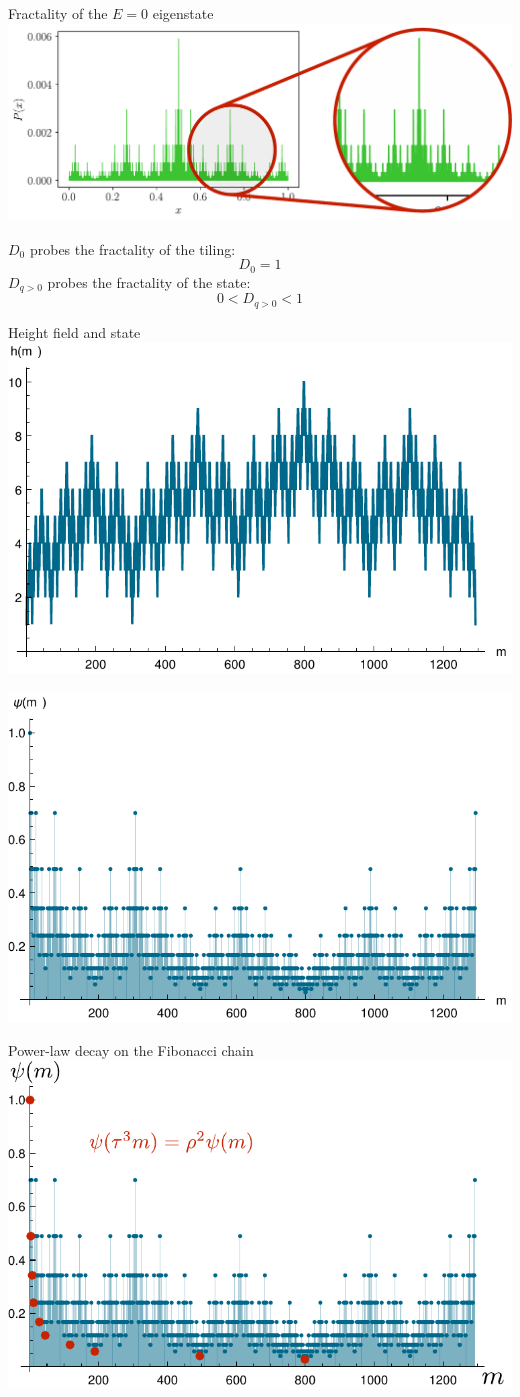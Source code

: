 \begin{frame}{Fractality of the $E=0$ eigenstate}
\centering
\includegraphics[width=1.\textwidth]{img/fractal_state}

\flushleft
$D_0$ probes the fractality of the tiling:
\[
	D_0 = 1
\]
$D_{q>0}$ probes the fractality of the state:
\[
	0 < D_{q>0} < 1
\]
\end{frame}

\begin{frame}{Height field and state}
\centering
\includegraphics[width=.5\textwidth]{img/heights}

\includegraphics[width=.5\textwidth]{img/wavefunction}
\end{frame}

\begin{frame}{Power-law decay on the Fibonacci chain}
\centering
\includegraphics[width=.7\textwidth]{img/power_law_decay}
\end{frame}

